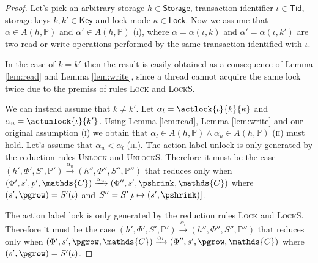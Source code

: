 \begin{proof}
Let's pick an arbitrary storage $h \in \mathsf{Storage}$, transaction identifier $\iota \in \mathsf{Tid}$, storage keys $k, k' \in \mathsf{Key}$ and lock mode $\kappa \in \mathsf{Lock}$. Now we assume that  $\alpha \in A(h, \mathds{P})$ and $\alpha' \in A(h, \mathds{P})$ (\textsc{i}), where $\alpha = \alpha(\iota, k)$ and $\alpha' = \alpha(\iota, k')$ are two read or write operations performed by the same transaction identified with $\iota$.

In the case of $k = k'$ then the result is easily obtained as a consequence of Lemma \ref{lem:read} and Lemma \ref{lem:write}, since a thread cannot acquire the same lock twice due to the premiss of rules \textsc{Lock} and \textsc{LockS}.

We can instead assume that $k \neq k'$. Let $\alpha_l = \actlock{\iota}{k}{\kappa}$ and $\alpha_u = \actunlock{\iota}{k'}$. Using Lemma \ref{lem:read}, Lemma \ref{lem:write} and our original assumption (\textsc{i}) we obtain that $\alpha_l \in A(h, \mathds{P}) \land \alpha_u \in A(h, \mathds{P})$ (\textsc{ii}) must hold. Let's assume that $\alpha_u < \alpha_l$ (\textsc{iii}). The action label \textsf{unlock} is only generated by the reduction rules \textsc{Unlock} and \textsc{UnlockS}. Therefore it must be the case $(h', \Phi', S', \mathds{P}') \xrightarrow{\alpha_u} (h'', \Phi'', S'', \mathds{P}'')$ that reduces only when $(\Phi', s', p', \mathds{C}) \xrightarrow{\alpha_u} (\Phi'', s', \pshrink, \mathds{C})$ where $(s', \pgrow) = S'(\iota)$ and $S'' = S'[\iota \mapsto (s', \pshrink)]$.

The action label \textsf{lock} is only generated by the reduction rules \textsc{Lock} and \textsc{LockS}. Therefore it must be the case $(h', \Phi', S', \mathds{P}') \xrightarrow{\alpha_l} (h'', \Phi'', S'', \mathds{P}'')$ that reduces only when $(\Phi', s', \pgrow, \mathds{C}) \xrightarrow{\alpha_l} (\Phi'', s', \pgrow, \mathds{C})$ where $(s', \pgrow) = S'(\iota)$.
\end{proof}
